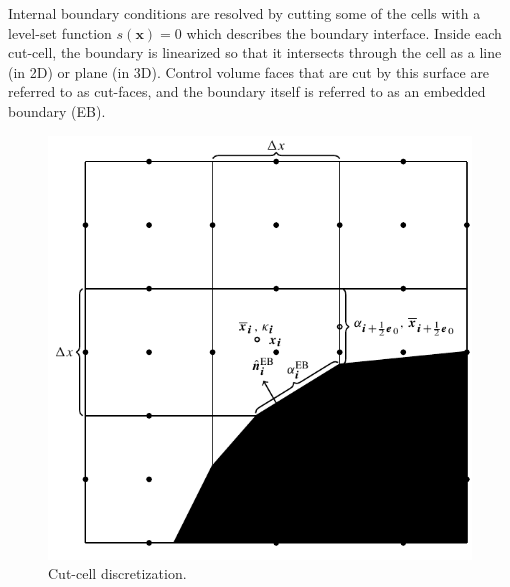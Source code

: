 \documentclass[3p]{elsarticle}
\begin{document}
Internal boundary conditions are resolved by cutting some of the cells with a level-set function $s(\bm{x}) = 0$ which describes the boundary interface. Inside each cut-cell, the boundary is linearized so that it intersects through the cell as a line (in 2D) or plane (in 3D). Control volume faces that are cut by this surface are referred to as cut-faces, and the boundary itself is referred to as an embedded boundary (EB). 

\begin{figure}[ht]
    \centering
    \includegraphics{./figures/spatial_discretization}
    \caption{Cut-cell discretization.}
    \label{fig:spatial_discretization}
\end{figure}
\end{document}
